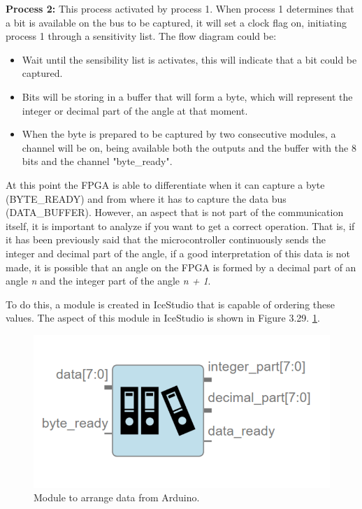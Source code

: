 \textbf{Process 2:} This process activated by process 1. When process 1 determines that a bit is available on the bus to be captured, it will set a clock flag on, initiating process 1 through a sensitivity list. The flow diagram could be:

\begin{itemize}
	\item Wait until the sensibility list is activates, this will indicate that a bit could be captured.
	\item Bits will be storing in a buffer that will form a byte, which will represent the integer or decimal part of the angle at that moment.
	\item When the byte is prepared to be captured by two consecutive modules, a channel will be on, being available both the outputs and the buffer with the 8 bits and the channel "byte\_ready".
\end{itemize}

At this point the FPGA is able to differentiate when it can capture a byte (BYTE\_READY) and from where it has to capture the data bus (DATA\_BUFFER). However, an aspect that is not part of the communication itself, it is important to analyze if you want to get a correct operation. That is, if it has been previously said that the microcontroller continuously sends the integer and decimal part of the angle, if a good interpretation of this data is not made, it is possible that an angle on the FPGA is formed by a decimal part of an angle \textit{n} and the integer part of the angle \textit{n + 1}.  \newline

To do this, a module is created in IceStudio that is capable of ordering these values. The aspect of this module in IceStudio is shown in Figure 3.29. \ref{fig:arrange_arduino}.

\begin{figure}[H]
	\center
	\includegraphics[scale=0.4]{imagenes/Balancing_robot/arrange_arduino.PNG}
	\caption{Module to arrange data from Arduino.}
	\label{fig:arrange_arduino}
\end{figure}

